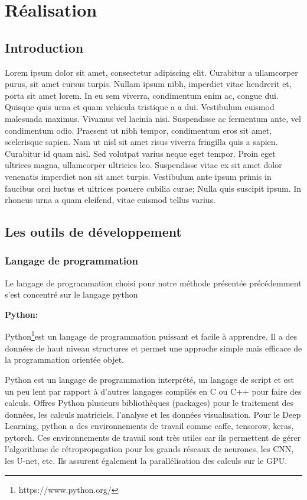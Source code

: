 \chapter{Réalisation}

\section{Introduction}
Lorem ipsum dolor sit amet, consectetur adipiscing elit. Curabitur a ullamcorper purus, sit amet cursus turpis. Nullam ipsum nibh, imperdiet vitae hendrerit et, porta sit amet lorem. In eu sem viverra, condimentum enim ac, congue dui. Quisque quis urna et quam vehicula tristique a a dui. Vestibulum euismod malesuada maximus. Vivamus vel lacinia nisi. Suspendisse ac fermentum ante, vel condimentum odio. Praesent ut nibh tempor, condimentum eros sit amet, scelerisque sapien. Nam ut nisl sit amet risus viverra fringilla quis a sapien. Curabitur id quam nisl. Sed volutpat varius neque eget tempor. Proin eget ultrices magna, ullamcorper ultricies leo. Suspendisse vitae ex sit amet dolor venenatis imperdiet non sit amet turpis. Vestibulum ante ipsum primis in faucibus orci luctus et ultrices posuere cubilia curae; Nulla quis suscipit ipsum. In rhoncus urna a quam eleifend, vitae euismod tellus varius.
\section{Les outils de développement}
\subsection{Langage de programmation}
Le langage de programmation choisi pour notre méthode présentée précédemment s'est concentré sur le langage python

\textbf{Python:}

Python\footnote{https://www.python.org/}est un langage de programmation puissant et facile à apprendre. Il a des données de haut niveau
structures et permet une approche simple mais efficace de la programmation orientée objet.

Python est un langage de programmation interprété, un langage de script et est un peu lent
par rapport à d'autres langages compilés en C ou C++ pour faire des calculs. Offres Python
plusieurs bibliothèques (packages) pour le traitement des données, les calculs matriciels, l'analyse et les données
visualisation. Pour le Deep Learning, python a des environnements de travail comme caffe, tensorow,
keras, pytorch. Ces environnements de travail sont très utiles car ils permettent de
gérer l'algorithme de rétropropagation pour les grands réseaux de neurones, les CNN, les U-net, etc.
Ils assurent également la parallélisation des calculs sur le GPU. 

